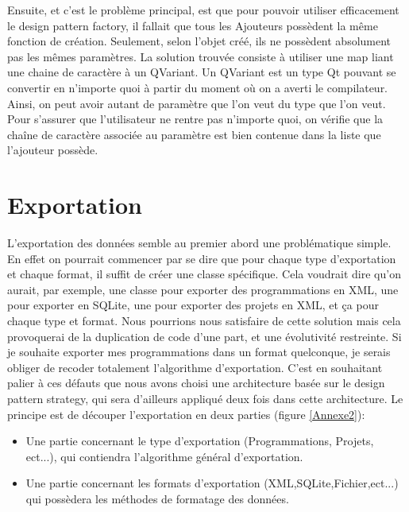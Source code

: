 Ensuite, et c’est le problème principal, est que pour pouvoir utiliser efficacement le design pattern factory, il fallait que tous les Ajouteurs possèdent la même fonction de création. Seulement, selon l’objet créé, ils ne possèdent absolument pas les mêmes paramètres. La solution trouvée consiste à utiliser une map liant une chaine de caractère à un QVariant. Un QVariant est un type Qt pouvant se convertir en n’importe quoi à partir du moment où on a averti le compilateur. Ainsi, on peut avoir autant de paramètre que l’on veut du type que l’on veut. Pour s’assurer que l’utilisateur ne rentre pas n’importe quoi, on vérifie que la chaîne de caractère associée au paramètre est bien contenue dans la liste que l’ajouteur possède. 

\section{Exportation}
L'exportation des données semble au premier abord une problématique simple. En effet on pourrait commencer par se dire que pour chaque type d'exportation et chaque format, il suffit de créer une classe spécifique. Cela voudrait dire qu'on aurait, par exemple, une classe pour exporter des programmations en XML, une pour exporter en SQLite, une pour exporter des projets en XML, et ça pour chaque type et format. Nous pourrions nous satisfaire de cette solution mais cela provoquerai de la duplication de code d'une part, et une évolutivité restreinte. Si je souhaite exporter mes programmations dans un format quelconque, je serais obliger de recoder totalement l'algorithme d'exportation. C'est en souhaitant palier à ces défauts que nous avons choisi une architecture basée sur le design pattern strategy, qui sera d'ailleurs appliqué deux fois dans cette architecture.
Le principe est de découper l'exportation en deux parties (figure \ref{Annexe2}):
\begin{itemize}
    \item Une partie concernant le type d'exportation (Programmations, Projets, ect...), qui contiendra l'algorithme général d'exportation.
    \item Une partie concernant les formats d'exportation (XML,SQLite,Fichier,ect...) qui possèdera les méthodes de formatage des données.
\end{itemize}

